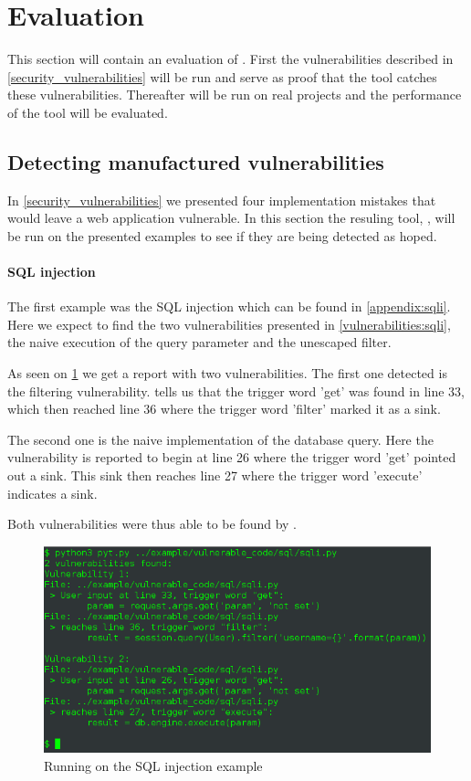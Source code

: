 \section{Evaluation}
This section will contain an evaluation of \pyt{}.
First the vulnerabilities described in \cref{security_vulnerabilities} will be run and serve as proof that the tool catches these vulnerabilities.
Thereafter \pyt{} will be run on real projects and the performance of the tool will be evaluated.

\subsection{Detecting manufactured vulnerabilities}
In \cref{security_vulnerabilities} we presented four implementation mistakes that would leave a web application vulnerable.
In this section the resuling tool, \pyt{}, will be run on the presented examples to see if they are being detected as hoped.

\paragraph{SQL injection}
The first example was the SQL injection which can be found in \cref{appendix:sqli}.
Here we expect to find the two vulnerabilities presented in \cref{vulnerabilities:sqli}, the naive execution of the query parameter and the unescaped filter.

As seen on \cref{sqli:console} we get a report with two vulnerabilities.
The first one detected is the filtering vulnerability.
\pyt{} tells us that the trigger word 'get' was found in line 33, which then reached line 36 where the trigger word 'filter' marked it as a sink.

The second one is the naive implementation of the database query.
Here the vulnerability is reported to begin at line 26 where the trigger word 'get' pointed out a sink.
This sink then reaches line 27 where the trigger word 'execute' indicates a sink.

Both vulnerabilities were thus able to be found by \pyt{}.

\begin{figure}
  \includegraphics[width=\textwidth]{./figures/sqli_console.png}
  \caption{Running \pyt{} on the SQL injection example}
  \label{sqli:console}
\end{figure}

